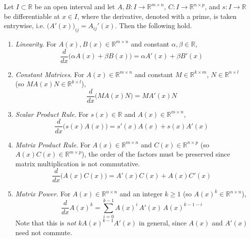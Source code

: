 	\begin{theorem}
	  \label{thm:scalar-input-matrix-valued-rules}
		Let $I \subset \mathbb{R}$ be an open interval and let $A, B: I \to \mathbb{R}^{m \times n}$, $C: I \to \mathbb{R}^{n \times p}$, and $s: I \to \mathbb{R}$ be differentiable at $x \in I$, where the derivative, denoted with a prime, is taken entrywise, i.e. $\big(A'(x)\big)_{ij} = A_{ij}'(x)$. Then the following hold.
		\begin{enumerate}
			\item \textit{Linearity}. For $A(x), B(x) \in \mathbb{R}^{m \times n}$ and constant $\alpha, \beta \in \mathbb{R}$,
				\begin{equation}
					\frac{d}{dx} \big( \alpha A(x) + \beta B(x) \big) = \alpha A'(x) + \beta B'(x)
				\end{equation}
			\item \textit{Constant Matrices}. For $A(x) \in \mathbb{R}^{m \times n}$ and constant $M \in \mathbb{R}^{k \times m}$, $N \in \mathbb{R}^{n \times l}$ (so $M A(x) N \in \mathbb{R}^{k \times l}$),
				\begin{equation}
					\frac{d}{dx} \big( M A(x) N \big) = M A'(x) N
				\end{equation}
			\item \textit{Scalar Product Rule}. For $s(x) \in \mathbb{R}$ and $A(x) \in \mathbb{R}^{m \times n}$,
				\begin{equation}
					\frac{d}{dx} \big( s(x) A(x) \big) = s'(x) A(x) + s(x) A'(x)
				\end{equation}
			\item \textit{Matrix Product Rule}. For $A(x) \in \mathbb{R}^{m \times n}$ and $C(x) \in \mathbb{R}^{n \times p}$ (so $A(x) C(x) \in \mathbb{R}^{m \times p}$), the order of the factors must be preserved since matrix multiplication is not commutative.
				\begin{equation}
					\frac{d}{dx} \big( A(x) C(x) \big) = A'(x) C(x) + A(x) C'(x)
				\end{equation}
			\item \textit{Matrix Power}. For $A(x) \in \mathbb{R}^{n \times n}$ and an integer $k \geq 1$ (so $A(x)^k \in \mathbb{R}^{n \times n}$),
				\begin{equation}
					\frac{d}{dx} A(x)^k = \sum_{i=0}^{k-1} A(x)^i \, A'(x) \, A(x)^{k-1-i}
				\end{equation}
				Note that this is \textit{not} $k A(x)^{k-1} A'(x)$ in general, since $A(x)$ and $A'(x)$ need not commute.

\end{enumerate}
\end{theorem}
